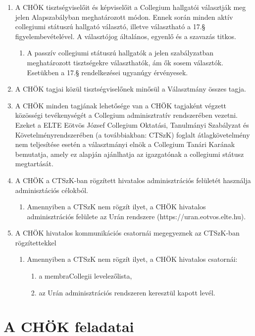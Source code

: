 \documentclass{../styles/rulebook}
\begin{document}
\begin{enumerate}
	\item A CHÖK tisztségviselőit és képviselőit a Collegium hallgatói választják meg jelen Alapszabályban meghatározott módon. Ennek során minden aktív collegiumi státuszú hallgató választó, illetve választható a 17.§ figyelembevételével. A választójog általános, egyenlő és a szavazás titkos.
	\begin{enumerate}
		\item A passzív collegiumi státuszú hallgatók a jelen szabályzatban meghatározott tisztségekre választhatók, ám ők sosem választók. Esetükben a 17.§ rendelkezései ugyanúgy érvényesek.
	\end{enumerate}
	\item A CHÖK tagjai közül tisztségviselőnek minősül a Választmány összes tagja.
	\item A CHÖK minden tagjának lehetősége van a CHÖK tagjaként végzett közösségi tevékenységét a Collegium adminisztratív rendszerében vezetni. Ezeket a ELTE Eötvös József Collegium Oktatási, Tanulmányi Szabályzat és Követelményrendszerében (a továbbiakban: CTSzK) foglalt átlagkövetelmény nem teljesítése esetén a választmányi elnök a Collegium Tanári Karának bemutatja, amely ez alapján ajánlhatja az igazgatónak a collegiumi státusz megtartását.
	\item A CHÖK a CTSzK-ban rögzített hivatalos adminisztrációs felületét használja adminisztációs célokból.
	\begin{enumerate}
		\item Amennyiben a CTSzK nem rögzít ilyet, a CHÖK hivatalos adminisztrációs felülete az Urán rendszere (https://uran.eotvos.elte.hu).
	\end{enumerate}
	\item A CHÖK hivatalos kommunikációs csatornái megegyeznek az CTSzK-ban rögzítettekkel
	\begin{enumerate}
		\item Amennyiben a CTSzK nem rögzít ilyet, a CHÖK hivatalos csatornái:
		\begin{enumerate}
			\item a membraCollegii levelezőlista,
			\item az Urán adminisztrációs rendszeren keresztül kapott levél.
		\end{enumerate}
	\end{enumerate}
	
\end{enumerate}


\section{A CHÖK feladatai}
\end{document}
